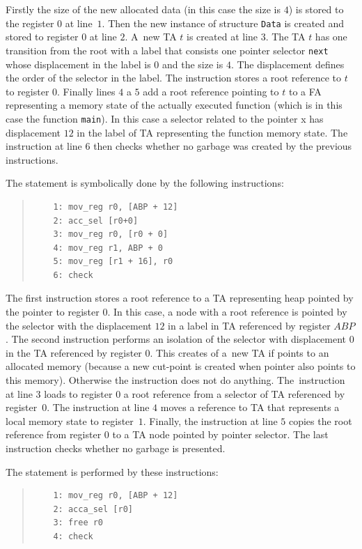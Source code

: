 	Firstly the size of the new allocated data (in this case the size is $4$) is stored to the register $0$ at line~$1$.
	Then the new instance of structure {\tt Data} is created and stored to register $0$ at line $2$.
	A~new TA $t$ is created at line $3$.
	The TA $t$ has one transition from the root with a label that consists one pointer selector {\tt next} whose
	displacement in the label is $0$ and the size is $4$.
	The displacement defines the order of the selector in the label.
	The instruction  stores a root reference to $t$ to register $0$.
	Finally lines $4$ a $5$ add a root reference pointing to $t$ to a FA representing
	a memory state of the actually executed function (which is in this case the function {\tt main}).
	In this case a selector related to the pointer x has displacement $12$ in the label of TA
	representing the function memory state.
	The instruction at line $6$ then checks whether no garbage was created by the previous instructions.
\eexmp

\bexmp
	The statement  is symbolically done by the following instructions:
	\begin{quote}
	\begin{verbatim}
	1: mov_reg r0, [ABP + 12]
	2: acc_sel [r0+0]
	3: mov_reg r0, [r0 + 0]
	4: mov_reg r1, ABP + 0
	5: mov_reg [r1 + 16], r0    
	6: check
	\end{verbatim}
	\end{quote}

	The first instruction stores a root reference to a TA representing heap pointed by the pointer  to register $0$.
	In this case, a node with a root reference is pointed by the selector with the displacement $12$ in a label in TA referenced by register $ABP$.
	The second instruction performs an isolation of the selector with displacement $0$ in the TA referenced by register $0$.
	This creates of a~new TA if  points to an allocated memory (because a new
	cut-point is created when pointer  also points to this memory).
	Otherwise the instruction does not do anything.
	The~instruction at line $3$ loads to register $0$ a root reference from a selector of TA referenced by register~$0$.
	The instruction at line $4$ moves a reference to TA that represents a local memory state to register~$1$.
	Finally, the instruction at line $5$ copies the root reference from register $0$ to
	a TA node pointed by pointer  selector.
	The last instruction checks whether no garbage is presented.
\eexmp

\bexmp
	The statement  is performed by these instructions:
	\begin{quote}
	\begin{verbatim}
	1: mov_reg r0, [ABP + 12]
	2: acca_sel [r0]
	3: free r0
	4: check
	\end{verbatim}
	\end{quote}

